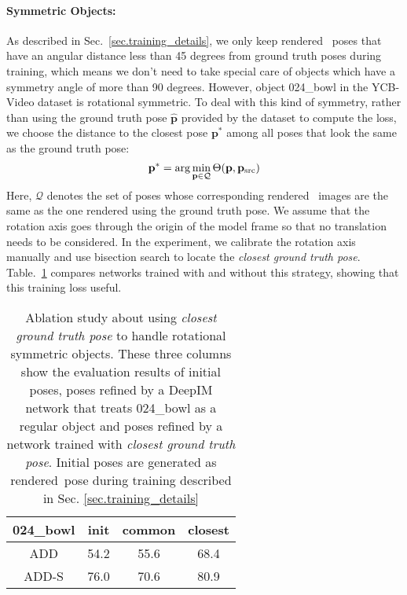 \documentclass[twocolumn]{svjour3}
\newcommand{\rend}[0]{rendered}
\newcommand{\gtpose}[0]{\mathbf{\hat{p}}}
\begin{document}
\paragraph{Symmetric Objects:} As described in Sec.~\ref{sec.training_details}, we only keep \rend~ poses that have an angular distance less than 45 degrees from ground truth poses during training, which means we don't need to take special care of objects which have a symmetry angle of more than 90 degrees. However, object 024\_bowl in the YCB-Video dataset is rotational symmetric. To deal with this kind of symmetry, rather than using the ground truth pose $\gtpose$ provided by the dataset to compute the loss, we choose the distance to the closest pose $\mathbf{p}^*$ among all poses that look the same as the ground truth pose:
\begin{equation}
\centering
    \mathbf{p}^*=\arg\min_{\mathbf{p}\in \mathcal{Q}}\Theta(\mathbf{p}, \mathbf{p}_\text{src})
\end{equation}
Here, $\mathcal{Q}$ denotes the set of poses whose corresponding \rend~ images are the same as the one rendered using the ground truth pose. We assume that the rotation axis goes through the origin of the model frame so that no translation needs to be considered. In the experiment, we calibrate the rotation axis manually and use bisection search to locate the \textit{closest ground truth pose}. Table.~\ref{table.ablation_on_symmetry} compares networks trained with and without this strategy, showing that this training loss useful.

\begin{table}[t]
    \centering
    \begin{tabular}{c|c|c|c}
    \hline
024\_bowl & init & common & closest \\
\hline
ADD & 54.2 & 55.6 & 68.4 \\
ADD-S & 76.0 & 70.6 & 80.9 \\
\hline
\end{tabular}
    \caption{Ablation study about using \textit{closest ground truth pose} to handle rotational symmetric objects. These three columns show the evaluation results of initial poses, poses refined by a DeepIM network that treats 024\_bowl as a regular object and poses refined by a network trained with \textit{closest ground truth pose}. Initial poses are generated as \rend~pose during training described in Sec. \ref{sec.training_details}}
    \label{table.ablation_on_symmetry}
\end{table}
\end{document}
